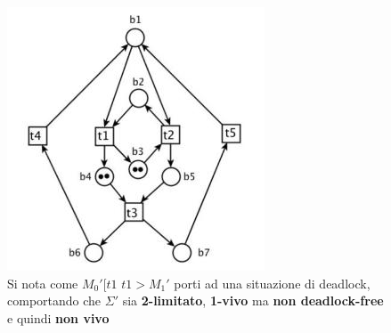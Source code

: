 \documentclass[a4paper,12pt, oneside]{book}
\begin{document}
\begin{esempio}
\begin{figure}[H]
    \includegraphics[scale = 0.435]{img/es4.jpg}   
    \caption{Si nota come $M_0' [t1\,\, t1 > M_1'$ porti ad una situazione di
      deadlock, comportando che $\Sigma'$ sia \textbf{2-limitato},
      \textbf{1-vivo} ma \textbf{non deadlock-free} e quindi \textbf{non vivo}}
  \end{figure}
\end{esempio}
\newpage
\end{document}
